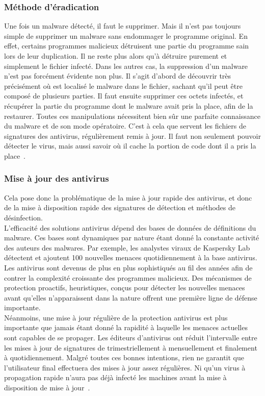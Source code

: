 \subsubsection{Méthode d'éradication}
Une fois un malware détecté, il faut le supprimer. Mais il n'est pas toujours simple de supprimer un malware  sans endommager le programme original. En effet, certains programmes malicieux  détruisent une partie du programme sain lors de leur duplication. Il ne reste plus alors qu'à détruire purement et simplement le fichier infecté. Dans les autres cas, la suppression d'un malware n'est pas forcément évidente non plus. Il s'agit d'abord de découvrir très précisément où est localisé le malware dans le fichier, sachant qu'il peut être composé de plusieurs parties. Il faut ensuite supprimer ces octets infectés, et récupérer la partie du programme dont le malware avait pris la place, afin de la restaurer. Toutes ces manipulations nécessitent bien sûr une parfaite connaissance du malware et de son mode opératoire. C'est à cela que servent les fichiers de signatures des antivirus, régulièrement remis à jour. Il faut non seulement pouvoir détecter le virus, mais aussi savoir où il cache la portion de code dont il a pris la place~\cite{antiv}.
\subsubsection{Mise à jour des antivirus}
Cela pose donc la problématique de la mise à jour rapide des antivirus, et donc de la mise à disposition rapide des signatures de détection et méthodes de désinfection.\\


L'efficacité des solutions antivirus dépend des bases de données de définitions du malware. Ces bases sont dynamiques par nature étant donné la constante activité des auteurs des malwares. Par exemple, les analystes viraux de Kaspersky Lab détectent et ajoutent 100 nouvelles menaces quotidiennement à la base antivirus.\\


Les antivirus sont devenus de plus en plus sophistiqués au fil des années afin de contrer la complexité croissante des programmes malicieux. Des mécanismes de protection proactifs, heuristiques, conçus pour détecter les nouvelles menaces avant qu'elles n'apparaissent dans la nature offrent une première ligne de défense importante.\\


Néanmoins, une mise à jour régulière de la protection antivirus est plus importante que jamais étant donné la rapidité à laquelle les menaces actuelles sont capables de se propager. Les éditeurs d'antivirus ont réduit l'intervalle entre les mises à jour de signatures de trimestriellement à mensuellement et finalement à quotidiennement. Malgré toutes ces bonnes intentions, rien ne garantit que l'utilisateur final effectuera des mises à jour assez régulières. Ni qu'un virus à propagation rapide n'aura pas déjà infecté les machines avant la mise à disposition de mise à jour~\cite{antivirus}.
